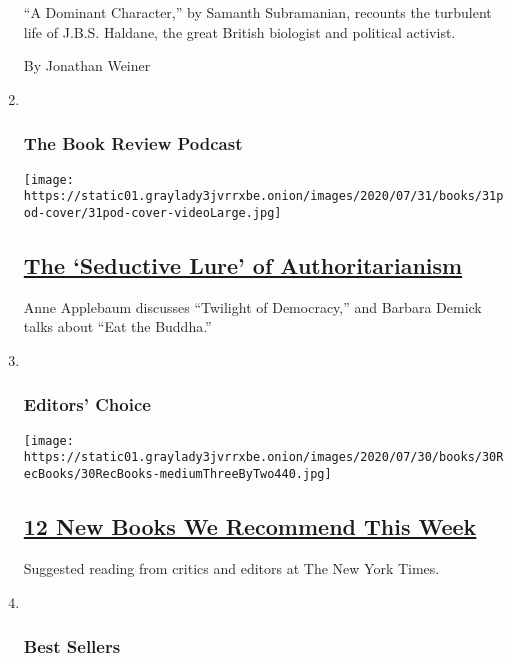 \begin{enumerate}
  ``A Dominant Character,'' by Samanth Subramanian, recounts the
  turbulent life of J.B.S. Haldane, the great British biologist and
  political activist.

  By Jonathan Weiner
\item ~
  \hypertarget{the-book-review-podcast}{%
  \subsubsection{The Book Review
  Podcast}\label{the-book-review-podcast}}

  \texttt{[image: https://static01.graylady3jvrrxbe.onion/images/2020/07/31/books/31pod-cover/31pod-cover-videoLarge.jpg]}

  \hypertarget{the-seductive-lure-of-authoritarianism}{%
  \subsection{\texorpdfstring{\href{/2020/07/31/books/review/podcast-twilight-democracy-anne-applebaum-eat-buddha-barbara-demick.html}{The
  `Seductive Lure' of
  Authoritarianism}}{The `Seductive Lure' of Authoritarianism}}\label{the-seductive-lure-of-authoritarianism}}

  Anne Applebaum discusses ``Twilight of Democracy,'' and Barbara Demick
  talks about ``Eat the Buddha.''
\item ~
  \hypertarget{editors-choice}{%
  \subsubsection{Editors' Choice}\label{editors-choice}}

  \texttt{[image: https://static01.graylady3jvrrxbe.onion/images/2020/07/30/books/30RecBooks/30RecBooks-mediumThreeByTwo440.jpg]}

  \hypertarget{12-new-books-we-recommend-this-week}{%
  \subsection{\texorpdfstring{\href{/2020/07/30/books/review/12-new-books-we-recommend-this-week.html}{12
  New Books We Recommend This
  Week}}{12 New Books We Recommend This Week}}\label{12-new-books-we-recommend-this-week}}

  Suggested reading from critics and editors at The New York Times.
\item ~
  \hypertarget{best-sellers}{%
  \subsubsection{Best Sellers}\label{best-sellers}}


\end{enumerate}

